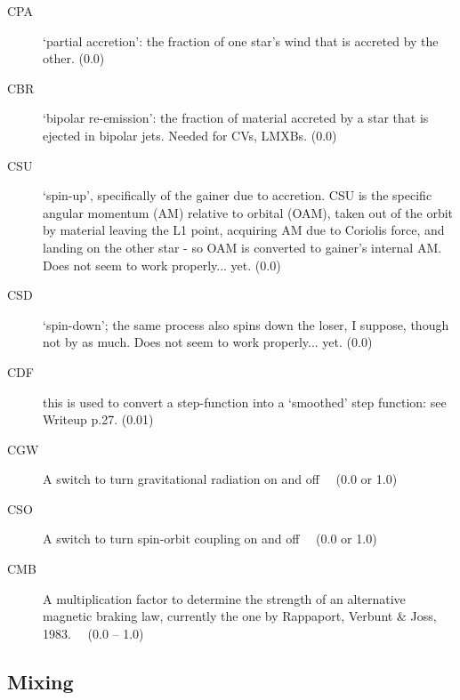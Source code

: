 \begin{description}
\item[CPA]\hypertarget{cpa}{} `partial accretion': the fraction of one star's wind that is accreted by the other.  (0.0)
\item[CBR]\hypertarget{cbr}{} `bipolar re-emission': the fraction of material accreted by a star that is ejected in bipolar jets. Needed for CVs, LMXBs. (0.0) 
\item[CSU]\hypertarget{csu}{} `spin-up', specifically of the gainer due to accretion. CSU is the specific angular momentum (AM) relative to orbital (OAM), taken out of the orbit 
  by material leaving the L1 point, acquiring AM due to Coriolis force, and landing on the other star - so OAM is converted to gainer's internal AM.
  Does not seem to work properly... yet. (0.0)
\item[CSD]\hypertarget{csd}{} `spin-down'; the same process also spins down the loser, I suppose, though not by as much. Does not seem to work properly... yet. (0.0)
\item[CDF]\hypertarget{cdf}{} this is used to convert a step-function into a `smoothed' step function: see Writeup p.27. (0.01)
\item[CGW]\hypertarget{cgw}{} A switch to turn gravitational radiation on and off \ \ (0.0 or 1.0)
\item[CSO]\hypertarget{cso}{} A switch to turn spin-orbit coupling on and off \ \ (0.0 or 1.0)
\item[CMB]\hypertarget{cmb}{} A multiplication factor to determine the strength of an alternative magnetic braking law, currently the one by 
  Rappaport, Verbunt \& Joss, 1983. \ \ (0.0 -- 1.0)
\end{description}



\subsection{Mixing}
\label{sec:initdat:mixing}

